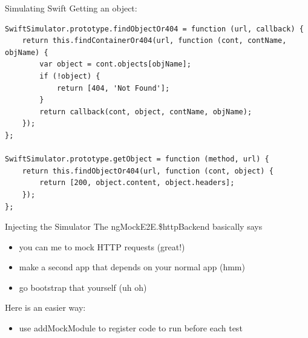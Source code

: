 \documentclass[t,noamsthm]{beamer}
\newcommand{\code}[1]{#1}
\begin{document}
\begin{frame}{Simulating Swift}
\framebreak
Getting an object:
\begin{lstlisting}
SwiftSimulator.prototype.findObjectOr404 = function (url, callback) {
    return this.findContainerOr404(url, function (cont, contName, objName) {
        var object = cont.objects[objName];
        if (!object) {
            return [404, 'Not Found'];
        }
        return callback(cont, object, contName, objName);
    });
};

SwiftSimulator.prototype.getObject = function (method, url) {
    return this.findObjectOr404(url, function (cont, object) {
        return [200, object.content, object.headers];
    });
};
\end{lstlisting}

\end{frame}

\begin{frame}{Injecting the Simulator}
  The \code{ngMockE2E.\$httpBackend} basically says
  \begin{itemize}
  \item you can me to mock HTTP requests (great!)
  \item make a second app that depends on your normal app (hmm)
  \item go bootstrap that yourself (uh oh)
  \end{itemize}

  Here is an easier way:
  \begin{itemize}
  \item use addMockModule to register code to run before each test
  \end{itemize}
\end{frame}
\end{document}
